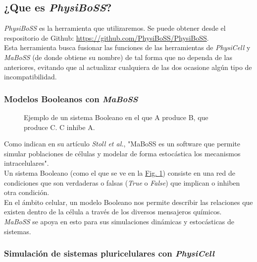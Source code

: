 \documentclass[11pt,a4paper]{article}
\begin{document}
	\subsection{¿Que es \textit{PhysiBoSS}?}
	\textit{PhysiBoSS} es la herramienta que utilizaremos. Se puede obtener desde el respositorio de Github: \url{https://github.com/PhysiBoSS/PhysiBoSS}.
	\\Esta herramienta busca fusionar las funciones de las herramientas de  \textit{PhysiCell}\supercite{physicell} y \textit{MaBoSS}\supercite{maboss} (de donde obtiene su nombre) de tal forma que no dependa de las anteriores, evitando que al actualizar cualquiera de las dos ocasione algún tipo de incompatibilidad.
	
	\subsubsection{Modelos Booleanos con \textit{MaBoSS}}
	\begin{figure}
		\vspace*{-12pt}
		\centering
		\caption{Ejemplo de un sistema Booleano en el que A produce B, que produce C. C inhibe A.}
		\label{fig:bool_ejemplo}
	\end{figure}
	Como indican en su artículo \textit{Stoll et al.}\supercite{maboss}, "MaBoSS es un software que permite simular poblaciones de células y modelar de forma estocástica los mecanismos intracelulares".
	\\Un sistema Booleano (como el que se ve en la \hyperref[fig:bool_ejemplo]{Fig. \ref{fig:bool_ejemplo}}) consiste en una red de condiciones que son verdaderas o falsas (\textit{True} o \textit{False}) que implican o inhiben otra condición.
	\\En el ámbito celular, un modelo Booleano nos permite describir las relaciones que existen dentro de la célula a través de los diversos mensajeros químicos.
	\\\textit{MaBoSS} se apoya en esto para sus simulaciones dinámicas y estocásticas de sistemas.
	
	\subsubsection{Simulación de sistemas pluricelulares con \textit{PhysiCell}}
	

	\newpage
	\printbibliography[title=Bibliografía consultada,heading=bibintoc]
\end{document}
